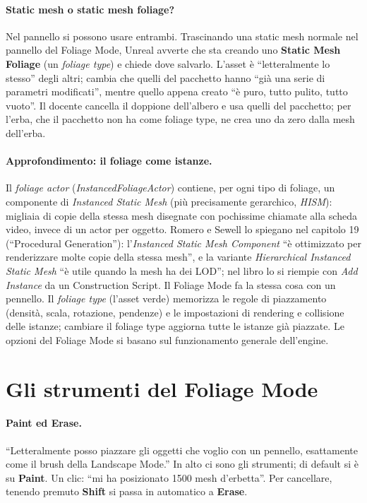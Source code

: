 \paragraph{Static mesh o static mesh foliage?} Nel pannello si possono usare entrambi.
Trascinando una static mesh normale nel pannello del Foliage Mode, Unreal avverte che sta
creando uno \textbf{Static Mesh Foliage} (un \emph{foliage type}) e chiede dove salvarlo.
L'asset è ``letteralmente lo stesso'' degli altri; cambia che quelli del pacchetto hanno ``già
una serie di parametri modificati'', mentre quello appena creato ``è puro, tutto pulito, tutto
vuoto''. Il docente cancella il doppione dell'albero e usa quelli del pacchetto; per l'erba,
che il pacchetto non ha come foliage type, ne crea uno da zero dalla mesh dell'erba.

\paragraph{Approfondimento: il foliage come istanze.} Il \emph{foliage actor}
(\emph{InstancedFoliageActor}) contiene, per ogni tipo di foliage, un componente di
\emph{Instanced Static Mesh} (più precisamente gerarchico, \emph{HISM}): migliaia di copie
della stessa mesh disegnate con pochissime chiamate alla scheda video, invece di un actor
per oggetto. Romero e Sewell lo spiegano nel capitolo 19 (``Procedural Generation''):
l'\emph{Instanced Static Mesh Component} ``è ottimizzato per renderizzare molte copie della
stessa mesh'', e la variante \emph{Hierarchical Instanced Static Mesh} ``è utile quando la
mesh ha dei LOD''; nel libro lo si riempie con \emph{Add Instance} da un Construction
Script. Il Foliage Mode fa la stessa cosa con un pennello. Il \emph{foliage type} (l'asset
verde) memorizza le regole di piazzamento (densità, scala, rotazione, pendenze) e le
impostazioni di rendering e collisione delle istanze; cambiare il foliage type aggiorna tutte
le istanze già piazzate. Le opzioni del Foliage Mode si basano sul funzionamento generale
dell'engine.

\section{Gli strumenti del Foliage Mode}
\label{ue15:sec:strumenti}

\paragraph{Paint ed Erase.} ``Letteralmente posso piazzare gli oggetti che voglio con un
pennello, esattamente come il brush della Landscape Mode.'' In alto ci sono gli strumenti; di
default si è su \textbf{Paint}. Un clic: ``mi ha posizionato 1500 mesh d'erbetta''. Per
cancellare, tenendo premuto \textbf{Shift} si passa in automatico a \textbf{Erase}.

